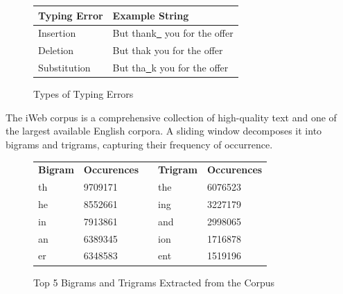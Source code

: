 \documentclass[final,20pt]{beamer}
\newlength{\sepwidth}
\newlength{\colwidth}
\newcommand{\separatorcolumn}{\begin{column}{\sepwidth}\end{column}}
\begin{document}
\begin{frame}[t]
\begin{columns}[t]
\separatorcolumn
\begin{column}{\colwidth}
    \begin{figure}[h]
    \begin{center}
    \begin{tabular}{l|l}
    \textbf{Typing Error} & \textbf{Example String} \\ \hline
    Insertion      & But thank\textcolor{brillaintblue}{\underline{\textcolor{white}{k}}} you for the offer                     \\
    Deletion       & But tha\textcolor{brillaintblue}{\underline{\hspace{0.2em}}}k you for the offer                       \\
    Substitution   & But tha\textcolor{brillaintblue}{\underline{\textcolor{white}{b}}}k you for the offer                      \\
    \end{tabular}
    \end{center}
    \caption{Types of Typing Errors}
    \label{fig:typing_errors}
    \end{figure}

    
    The iWeb corpus is a comprehensive collection of high-quality text and one of the largest available English corpora. A sliding window decomposes it into bigrams and trigrams, capturing their frequency of occurrence.

    \begin{figure}[h]
    \begin{table}[h]
    \begin{tabular}{lllll}
    \textbf{Bigram} & \textbf{Occurences} &  & \textbf{Trigram} & \textbf{Occurences} \\
    th              & 9709171             &  & the              & 6076523             \\
    he              & 8552661             &  & ing              & 3227179             \\
    in              & 7913861             &  & and              & 2998065             \\
    an              & 6389345             &  & ion              & 1716878             \\
    er              & 6348583             &  & ent              & 1519196            
    \end{tabular}
    \end{table}
    \caption{Top 5 Bigrams and Trigrams Extracted from the Corpus}
    \label{fig:ngrams}
    \end{figure}
    

\end{column}
\end{columns}
\end{frame}
\end{document}
